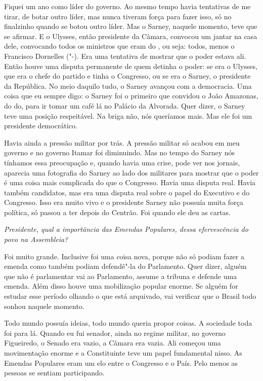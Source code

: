 Fiquei um ano como líder do governo. Ao mesmo tempo havia tentativas de
me tirar, de botar outro líder, mas nunca tiveram força para fazer isso,
só no finalzinho quando se botou outro líder. Mas o Sarney, naquele
momento, teve que se afirmar. E o Ulysses, então presidente da Câmara,
convocou um jantar na casa dele, convocando todos os ministros que eram
do , ou seja: todos, menos o Francisco Dornelles ("-). Era uma
tentativa de mostrar que o poder estava ali. Então houve uma disputa
permanente de quem detinha o poder: se era o Ulysses, que era o chefe do
partido e tinha o Congresso, ou se era o Sarney, o presidente da
República. No meio daquilo tudo, o Sarney avançou com a democracia. Uma
coisa que eu sempre digo: o Sarney foi o primeiro que convidou o João
Amazonas, do do, para ir tomar um café lá no Palácio da Alvorada.
Quer dizer, o Sarney teve uma posição respeitável. Na briga não, nós
queríamos mais. Mas ele foi um presidente democrático.

Havia ainda a pressão militar por trás. A pressão militar só acabou em
meu governo e no governo Itamar foi diminuindo. Mas no tempo do Sarney
nós tínhamos essa preocupação e, quando havia uma crise, pode ver nos
jornais, aparecia uma fotografia do Sarney ao lado dos militares para
mostrar que o poder é uma coisa mais complicada do que o Congresso.
Havia uma disputa real. Havia também candidatos, mas era uma disputa
real sobre o papel do Executivo e do Congresso. Isso era muito vivo e o
presidente Sarney não possuía muita força política, só passou a ter
depois do Centrão. Foi quando ele deu as cartas.

\medskip

\noindent\emph{Presidente, qual a importância das Emendas Populares, dessa
efervescência do povo na Assembleia? }

Foi muito grande. Inclusive foi uma coisa nova, porque não
só podiam fazer a emenda como também podiam defendê"-la do Parlamento.
Quer dizer, alguém que não é parlamentar vai ao Parlamento, assume a
tribuna e defende uma emenda. Além disso houve uma mobilização popular
enorme. Se alguém for estudar esse período olhando o que está arquivado,
vai verificar que o Brasil todo sonhou naquele momento.

Todo mundo possuía ideias, todo mundo queria propor coisas. A sociedade
toda foi para lá. Quando eu fui senador, ainda no regime militar, no
governo Figueiredo, o Senado era vazio, a Câmara era vazia. Ali começou
uma movimentação enorme e a Constituinte teve um papel fundamental
nisso. As Emendas Populares eram um elo entre o Congresso e o País. Pelo
menos as pessoas se sentiam participando.

